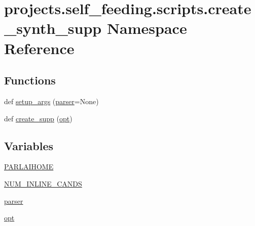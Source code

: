 \hypertarget{namespaceprojects_1_1self__feeding_1_1scripts_1_1create__synth__supp}{}\section{projects.\+self\+\_\+feeding.\+scripts.\+create\+\_\+synth\+\_\+supp Namespace Reference}
\label{namespaceprojects_1_1self__feeding_1_1scripts_1_1create__synth__supp}
\subsection*{Functions}
\begin{DoxyCompactItemize}
\item 
def \hyperlink{namespaceprojects_1_1self__feeding_1_1scripts_1_1create__synth__supp_ac102836989a094f474dc72bb0aea814e}{setup\+\_\+args} (\hyperlink{namespaceprojects_1_1self__feeding_1_1scripts_1_1create__synth__supp_a8da22689879eac4440c61a84a853116f}{parser}=None)
\item 
def \hyperlink{namespaceprojects_1_1self__feeding_1_1scripts_1_1create__synth__supp_a81cbb13896d9614507b68362e90d8f6c}{create\+\_\+supp} (\hyperlink{namespaceprojects_1_1self__feeding_1_1scripts_1_1create__synth__supp_afdf666a946d736b36f7ea30bc79b68a5}{opt})
\end{DoxyCompactItemize}
\subsection*{Variables}
\begin{DoxyCompactItemize}
\item 
\hyperlink{namespaceprojects_1_1self__feeding_1_1scripts_1_1create__synth__supp_a908a2aa407818b82de25657d8134fad0}{P\+A\+R\+L\+A\+I\+H\+O\+ME}
\item 
\hyperlink{namespaceprojects_1_1self__feeding_1_1scripts_1_1create__synth__supp_a5b495f99032281c13a567348fb396e0b}{N\+U\+M\+\_\+\+I\+N\+L\+I\+N\+E\+\_\+\+C\+A\+N\+DS}
\item 
\hyperlink{namespaceprojects_1_1self__feeding_1_1scripts_1_1create__synth__supp_a8da22689879eac4440c61a84a853116f}{parser}
\item 
\hyperlink{namespaceprojects_1_1self__feeding_1_1scripts_1_1create__synth__supp_afdf666a946d736b36f7ea30bc79b68a5}{opt}
\end{DoxyCompactItemize}



